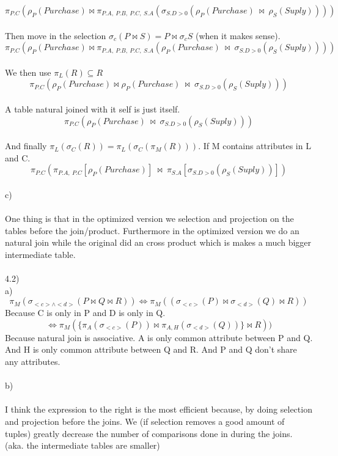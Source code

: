 \documentclass[12pt, letterpaper, twoside]{article}
\begin{document}
$$
\pi_{P.C}(\rho_P(Purchase) \bowtie
\pi_{P.A,\ P.B,\ P.C,\ S.A}(\sigma_{S.D > 0}(\rho_P(Purchase)\ \bowtie\ \rho_S(Suply))))
$$
\\
Then move in the selection $\sigma_c(P \bowtie S) = P \bowtie \sigma_cS$ (when it makes sense).\\
$$
\pi_{P.C}(\rho_P(Purchase) \bowtie
\pi_{P.A,\ P.B,\ P.C,\ S.A}(\rho_P(Purchase)\ \bowtie\ \sigma_{S.D > 0}(\rho_S(Suply))))
$$
\\
We then use $\pi_L(R) \subseteq R$\\
$$
\pi_{P.C}(\rho_P(Purchase) \bowtie
\rho_P(Purchase)\ \bowtie\ \sigma_{S.D > 0}(\rho_S(Suply)))
$$
\\
A table natural joined with it self is just itself.
$$
\pi_{P.C}(
\rho_P(Purchase)\ \bowtie\ \sigma_{S.D > 0}(\rho_S(Suply)))
$$
\\
And finally $\pi_L(\sigma_C(R)) = \pi_L(\sigma_C(\pi_M(R)))$. If M contains attributes in L and C.\\
 $$
\pi_{P.C}(
\pi_{P.A,\ P.C}[\rho_P(Purchase)]\ \bowtie\ \pi_{S.A}[\sigma_{S.D > 0}(\rho_S(Suply))])
$$
\\
c)\\
\\
One thing is that in the optimized version we selection and projection on the tables before the join/product. Furthermore in the optimized version we do an natural join while the original did an cross product which is makes a much bigger intermediate table.\\
\\
4.2)\\
a)\\
$$
\pi_M(\sigma_{<c> \wedge <d>}(P \bowtie Q \bowtie R))
\iff
\pi_M((\sigma_{<c>}(P) \bowtie \sigma_{<d>}(Q) \bowtie R))
$$
Because C is only in P and D is only in Q.
$$
\iff 
\pi_M(\{\pi_A(\sigma_{<c>}(P)) \bowtie \pi_{A,H}(\sigma_{<d>}(Q))\} \bowtie R))
$$
Because natural join is associative. A is only common attribute between P and Q. And H is only common attribute between Q and R. And P and Q don't share any attributes.\\
\\
b)\\
\\
I think the expression to the right is the most efficient because, by doing selection and projection before the joins. We (if selection removes a good amount of tuples) greatly decrease the number of comparisons done in during the joins. (aka. the intermediate tables are smaller)\\
\end{document}
